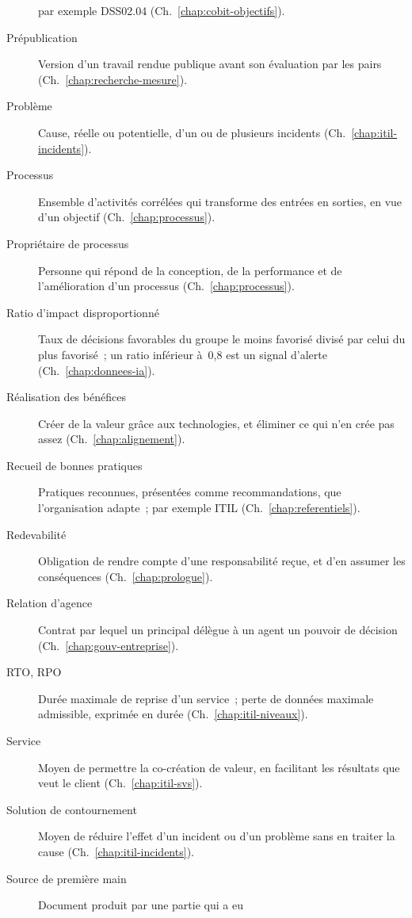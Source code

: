 \begin{description}
          par exemple DSS02.04 (Ch.~\ref{chap:cobit-objectifs}).
    \item[Prépublication] Version d'un travail rendue publique avant son
          évaluation par les pairs (Ch.~\ref{chap:recherche-mesure}).
    \item[Problème] Cause, réelle ou potentielle, d'un ou de plusieurs
          incidents (Ch.~\ref{chap:itil-incidents}).
    \item[Processus] Ensemble d'activités corrélées qui transforme des
          entrées en sorties, en vue d'un objectif (Ch.~\ref{chap:processus}).
    \item[Propriétaire de processus] Personne qui répond de la conception, de
          la performance et de l'amélioration d'un processus
          (Ch.~\ref{chap:processus}).
    \item[Ratio d'impact disproportionné] Taux de décisions favorables du
          groupe le moins favorisé divisé par celui du plus favorisé~; un
          ratio inférieur à~0,8 est un signal d'alerte
          (Ch.~\ref{chap:donnees-ia}).
    \item[Réalisation des bénéfices] Créer de la valeur grâce aux
          technologies, et éliminer ce qui n'en crée pas assez
          (Ch.~\ref{chap:alignement}).
    \item[Recueil de bonnes pratiques] Pratiques reconnues, présentées comme
          recommandations, que l'organisation adapte~; par exemple ITIL
          (Ch.~\ref{chap:referentiels}).
    \item[Redevabilité] Obligation de rendre compte d'une responsabilité
          reçue, et d'en assumer les conséquences (Ch.~\ref{chap:prologue}).
    \item[Relation d'agence] Contrat par lequel un principal délègue à un
          agent un pouvoir de décision (Ch.~\ref{chap:gouv-entreprise}).
    \item[RTO, RPO] Durée maximale de reprise d'un service~; perte de
          données maximale admissible, exprimée en durée
          (Ch.~\ref{chap:itil-niveaux}).
    \item[Service] Moyen de permettre la co-création de valeur, en
          facilitant les résultats que veut le client
          (Ch.~\ref{chap:itil-svs}).
    \item[Solution de contournement] Moyen de réduire l'effet d'un incident
          ou d'un problème sans en traiter la cause
          (Ch.~\ref{chap:itil-incidents}).
    \item[Source de première main] Document produit par une partie qui a eu

\end{description}
